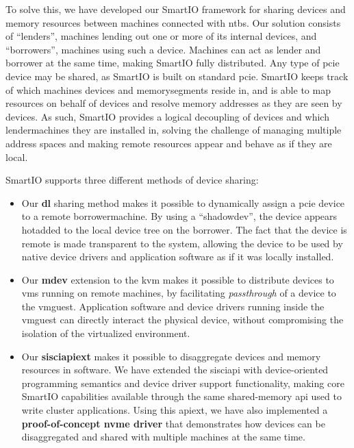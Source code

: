 To solve this, we have developed our SmartIO framework for sharing devices and memory resources between machines connected with \glspl{ntb}.
%
Our solution consists of ``\glspl{lender}'', machines lending out one or more of its internal devices, and ``\glspl{borrower}'', machines using such a device.
%
Machines can act as \gls{lender} and \gls{borrower} at the same time, making SmartIO fully distributed.
%
Any type of \gls{pcie} device may be shared, as SmartIO is built on standard \gls{pcie}.
%
SmartIO keeps track of which machines devices and \glspl{memorysegment} reside in, and is able to map resources on behalf of devices and resolve memory addresses as they are seen by devices.
%
As such, SmartIO provides a logical decoupling of devices and which \glspl{lendermachine} they are installed in, solving the challenge of managing multiple address spaces and making remote resources appear and behave as if they are local.




SmartIO supports three different methods of device sharing:
%
\begin{itemize}
    \item Our \textbf{\gls{dl}} sharing method makes it possible to dynamically assign a \gls{pcie} device to a remote \gls{borrowermachine}.
        By using a ``\gls{shadowdev}'', the device appears \gls{hotadded} to the local device tree on the \gls{borrower}.
        The fact that the device is remote is made transparent to the system, allowing the device to be used by native device drivers and application software as if it was locally installed.


    \item Our \textbf{\gls{mdev}} extension to the \gls{kvm} makes it possible to distribute devices to \glspl{vm} running on remote machines, by facilitating \emph{\gls{passthrough}} of a device to the \gls{vmguest}.
        Application software and device drivers running inside the \gls{vmguest} can directly interact the physical device, without compromising the isolation of the virtualized environment.


    \item Our \textbf{\gls{sisciapiext}} makes it possible to \gls{disaggregate} devices and memory resources in software.
        We have extended the \gls{sisciapi} with device-oriented programming semantics and device driver support functionality, making core SmartIO capabilities available through the same shared-memory \gls{api} used to write cluster applications.
        Using this \gls{apiext}, we have also implemented a \textbf{proof-of-concept \gls{nvme} driver} that demonstrates how devices can be \gls{disaggregated} and shared with multiple machines at the same time.
        
\end{itemize}





